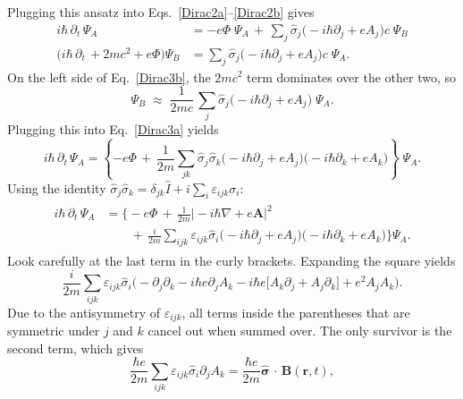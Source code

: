 \documentclass[prx,12pt]{revtex4-2}
\begin{document}
Plugging this ansatz into Eqs.~\eqref{Dirac2a}--\eqref{Dirac2b} gives
\begin{align}
  i\hbar\, \partial_t \, \Psi_A
  &= -e\Phi\; \Psi_A
  \,+\, \sum_{j} \hat{\sigma}_j \big(-i\hbar\partial_j
    +eA_j \big) c\;\Psi_B \label{Dirac3a} \\
  \big(i\hbar\, \partial_t \, + 2mc^2 + e\Phi\big)
  \Psi_B
  &= \sum_{j} \hat{\sigma}_j \big(-i\hbar\partial_j
    +eA_j \big) c\;\Psi_A. \label{Dirac3b}
\end{align}
On the left side of Eq.~\eqref{Dirac3b}, the $2mc^2$ term dominates
over the other two, so
\begin{equation}
  \Psi_B \;\approx\; \frac{1}{2mc}\, \sum_{j}
  \hat{\sigma}_j \big(-i\hbar\partial_j +eA_j \big) \;\Psi_A.
\end{equation}
Plugging this into Eq.~\eqref{Dirac3a} yields
\begin{equation}
  i\hbar\, \partial_t \, \Psi_A
  = \left\{-e\Phi \,+\, \frac{1}{2m} \sum_{jk} \hat{\sigma}_j \hat{\sigma}_k
  \big(-i\hbar\partial_j +eA_j \big)
  \big(-i\hbar\partial_k +eA_k \big) \right\}\;\Psi_A.
\end{equation}
Using the identity $\hat{\sigma}_j\hat{\sigma}_k = \delta_{jk}\hat{I}
+ i \sum_i \varepsilon_{ijk}\sigma_i$:
\begin{align}
  \begin{aligned}
  i\hbar\, \partial_t \, \Psi_A
  &= \Bigg\{-e\Phi
  \,+\, \frac{1}{2m} \big|-i\hbar\nabla +e\mathbf{A} \big|^2 \\
  &\qquad+\, \frac{i}{2m} \sum_{ijk} \varepsilon_{ijk} \hat{\sigma}_i
  \big(-i\hbar\partial_j +eA_j \big)
  \big(-i\hbar\partial_k +eA_k \big)
  \Bigg\} \Psi_A.
  \end{aligned}
\end{align}
Look carefully at the last term in the curly brackets.  Expanding the
square yields
\begin{equation*}
  \frac{i}{2m}\sum_{ijk}\varepsilon_{ijk}\hat{\sigma}_i
  \Big(-\partial_j\partial_k -i\hbar e \partial_jA_k
  - i\hbar e \big[A_k\partial_j + A_j\partial_k \big]
  + e^2A_jA_k \Big).
\end{equation*}
Due to the antisymmetry of $\varepsilon_{ijk}$, all terms inside the
parentheses that are symmetric under $j$ and $k$ cancel out when
summed over.  The only survivor is the second term, which gives
\begin{equation}
  \frac{\hbar e}{2m}\sum_{ijk}\varepsilon_{ijk}\hat{\sigma}_i
  \partial_jA_k = \frac{\hbar e}{2m} \hat{\boldsymbol{\sigma}}
  \,\cdot\, \mathbf{B}(\mathbf{r},t),
\end{equation}
\end{document}
